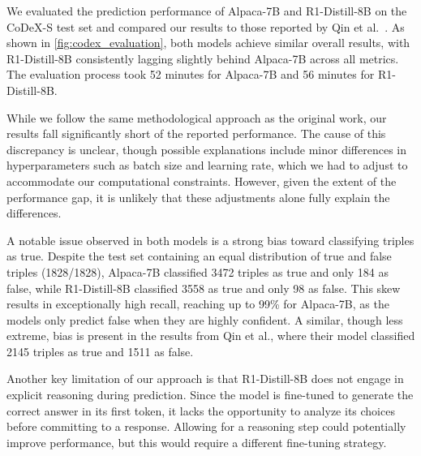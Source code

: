 \documentclass[12pt,a4paper]{article}
\newcommand{\modelalpaca}{Alpaca-7B\xspace}
\newcommand{\modeldeepseek}{R1-Distill-8B\xspace}
\begin{document}
We evaluated the prediction performance of \modelalpaca and \modeldeepseek on the CoDeX-S test set and compared our results to those reported by Qin et al.~\cite{qin2023kopa}.
As shown in \cref{fig:codex_evaluation}, both models achieve similar overall results, with \modeldeepseek consistently lagging slightly behind \modelalpaca across all metrics.
The evaluation process took 52 minutes for \modelalpaca and 56 minutes for \modeldeepseek.

While we follow the same methodological approach as the original work, our results fall significantly short of the reported performance.
The cause of this discrepancy is unclear, though possible explanations include minor differences in hyperparameters such as batch size and learning rate, which we had to adjust to accommodate our computational constraints.
However, given the extent of the performance gap, it is unlikely that these adjustments alone fully explain the differences.

A notable issue observed in both models is a strong bias toward classifying triples as true.
Despite the test set containing an equal distribution of true and false triples (1828/1828), \modelalpaca classified 3472 triples as true and only 184 as false, while \modeldeepseek classified 3558 as true and only 98 as false.
This skew results in exceptionally high recall, reaching up to 99\% for \modelalpaca, as the models only predict false when they are highly confident.
A similar, though less extreme, bias is present in the results from Qin et al., where their model classified 2145 triples as true and 1511 as false.

Another key limitation of our approach is that \modeldeepseek does not engage in explicit reasoning during prediction.
Since the model is fine-tuned to generate the correct answer in its first token, it lacks the opportunity to analyze its choices before committing to a response.
Allowing for a reasoning step could potentially improve performance, but this would require a different fine-tuning strategy.
\end{document}
